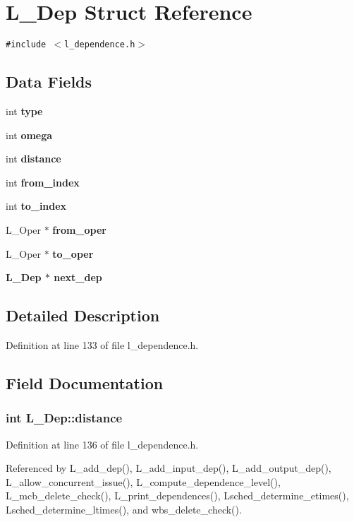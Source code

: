 \section{L\_\-Dep Struct Reference}
\label{structL__Dep}
{\tt \#include $<$l\_\-dependence.h$>$}

\subsection*{Data Fields}
\begin{CompactItemize}
\item 
int \bf{type}
\item 
int \bf{omega}
\item 
int \bf{distance}
\item 
int \bf{from\_\-index}
\item 
int \bf{to\_\-index}
\item 
L\_\-Oper $\ast$ \bf{from\_\-oper}
\item 
L\_\-Oper $\ast$ \bf{to\_\-oper}
\item 
\bf{L\_\-Dep} $\ast$ \bf{next\_\-dep}
\end{CompactItemize}


\subsection{Detailed Description}




Definition at line 133 of file l\_\-dependence.h.

\subsection{Field Documentation}
\subsubsection{\setlength{\rightskip}{0pt plus 5cm}int \bf{L\_\-Dep::distance}}\label{structL__Dep_3aa4c183f3db7e0f38d6d6d4c0b6ea5f}




Definition at line 136 of file l\_\-dependence.h.

Referenced by L\_\-add\_\-dep(), L\_\-add\_\-input\_\-dep(), L\_\-add\_\-output\_\-dep(), L\_\-allow\_\-concurrent\_\-issue(), L\_\-compute\_\-dependence\_\-level(), L\_\-mcb\_\-delete\_\-check(), L\_\-print\_\-dependences(), Lsched\_\-determine\_\-etimes(), Lsched\_\-determine\_\-ltimes(), and wbs\_\-delete\_\-check().
